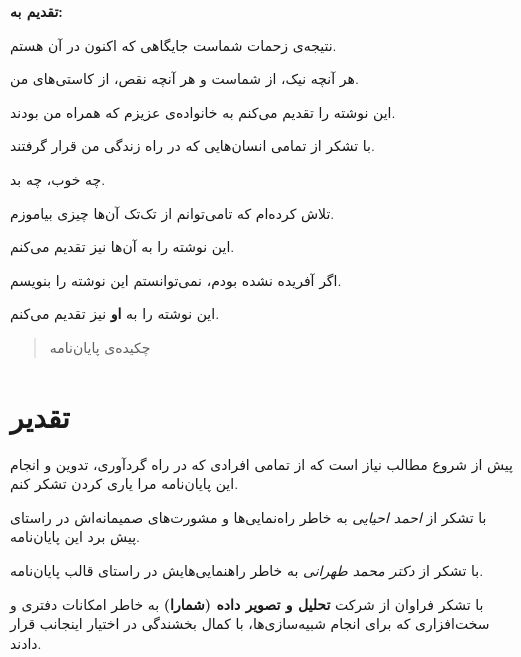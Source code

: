 \documentclass[a4paper,11px]{article}
\begin{document}
{\Large
\textbf{
تقدیم به:
}

\vfill

نتیجه‌ی زحمات شماست جایگاهی که اکنون در آن هستم.

هر آنچه نیک، از شماست و هر آنچه نقص، از کاستی‌های من.

این نوشته را تقدیم می‌کنم به خانواده‌ی عزیزم که همراه من بودند.

\vfill

با تشکر از تمامی انسان‌هایی که در راه زندگی من قرار گرفتند.

چه خوب، چه بد.

تلاش کرده‌ام که تامی‌توانم از تک‌تک آن‌ها چیزی بیاموزم.

این نوشته را به آن‌ها نیز تقدیم می‌کنم.

\vfill


اگر آفریده نشده بودم، نمی‌توانستم این نوشته را بنویسم.

این نوشته را به 
\textbf{
او
} 
نیز تقدیم می‌کنم.


}

\vfill
\newpage


\begin{abstract}
چکیده‌ی پایان‌نامه
\end{abstract}
\newpage

\section*{
تقدیر
}

پیش از شروع مطالب نیاز است که از تمامی افرادی که در راه گردآوری، تدوین و انجام این پایان‌نامه مرا یاری کردن تشکر کنم.

\vspace{10mm}

با تشکر از 
\textit{
احمد احیایی
} 
به خاطر راه‌نمایی‌ها و مشورت‌های صمیمانه‌اش در راستای پیش برد این پایان‌نامه.

\vspace{10mm}

با تشکر از 
\textit{
دکتر محمد طهرانی
} 
به خاطر راهنمایی‌هایش در راستای قالب پایان‌نامه.

\vspace{10mm}

با تشکر فراوان از شرکت 
\textbf{
تحلیل و تصویر داده (شمارا)
} 
به خاطر امکانات دفتری و سخت‌افزاری که برای انجام شبیه‌سازی‌ها، با کمال بخشندگی در اختیار اینجانب قرار دادند.
\end{document}

